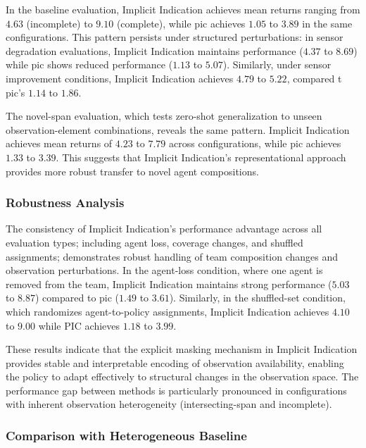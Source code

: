 \documentclass[conference]{IEEEtran}
\begin{document}
In the baseline evaluation, Implicit Indication achieves mean 
returns ranging from $4.63$ (incomplete) to $9.10$ (complete), 
while \gls{pic} achieves $1.05$ to $3.89$ in the same configurations. 
This pattern persists under structured perturbations: 
in sensor degradation evaluations, Implicit Indication maintains 
performance ($4.37$ to $8.69$) while \gls{pic} shows reduced performance 
($1.13$ to $5.07$). Similarly, under sensor improvement conditions, 
Implicit Indication achieves $4.79$ to $5.22$, 
compared t \gls{pic}'s $1.14$ to $1.86$.

The novel-span evaluation, which tests zero-shot generalization to 
unseen observation-element combinations, reveals the same pattern. 
Implicit Indication achieves mean returns of $4.23$ to $7.79$ across 
configurations, while \gls{pic} achieves $1.33$ to $3.39$. 
This suggests that Implicit Indication's representational 
approach provides more robust transfer to novel agent compositions.

\subsubsection{Robustness Analysis}

The consistency of Implicit Indication's performance advantage across 
all evaluation types; including agent loss, coverage changes, 
and shuffled assignments; demonstrates robust handling 
of team composition changes and observation perturbations. 
In the agent-loss condition, where one agent is removed from the team, 
Implicit Indication maintains strong performance ($5.03$ to $8.87$) 
compared to \gls{pic} ($1.49$ to $3.61$). Similarly, 
in the shuffled-set condition, which randomizes agent-to-policy assignments, 
Implicit Indication achieves $4.10$ to $9.00$ while PIC achieves $1.18$ to $3.99$.

These results indicate that the explicit masking mechanism in Implicit Indication 
provides stable and interpretable encoding of observation availability, 
enabling the policy to adapt effectively to structural changes in the observation space. 
The performance gap between methods is particularly pronounced in configurations with 
inherent observation heterogeneity (intersecting-span and incomplete).

\subsubsection{Comparison with Heterogeneous Baseline}
\end{document}
